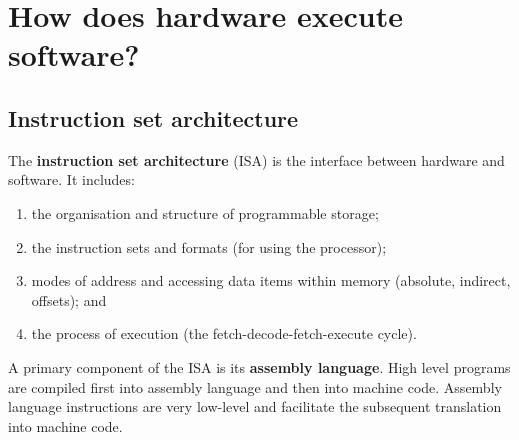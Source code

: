 \chapter{How does hardware execute software?}

\section{Instruction set architecture}

\begin{definition}
    The \textbf{instruction set architecture} (ISA) is the interface between hardware and software. It includes:
    \begin{enumerate}
        \item the organisation and structure of programmable storage;
        \item the instruction sets and formats (for using the processor);
        \item modes of address and accessing data items within memory (absolute, indirect, offsets); and
        \item the process of execution (the fetch-decode-fetch-execute cycle).
    \end{enumerate}
    A primary component of the ISA is its \textbf{assembly language}. High level programs are compiled first into assembly language and then into machine code. Assembly language instructions are very low-level and facilitate the subsequent translation into machine code.
\end{definition}

